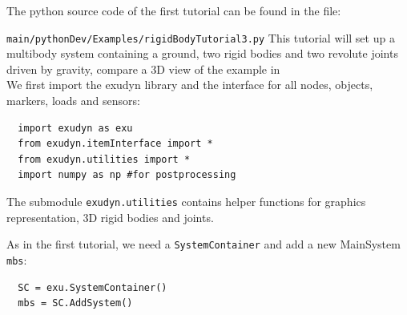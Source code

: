 \newpage
{}
The python source code of the first tutorial can be found in the file:
\bi
  \item[] \texttt{main/pythonDev/Examples/rigidBodyTutorial3.py}
\ei
This tutorial will set up a multibody system containing a ground, two rigid bodies and two revolute joints driven by gravity, compare a 3D view of the example in  
\horizontalRuler\\
\noindent We first import the exudyn library and the interface for all nodes, objects, markers, loads and sensors:
\pythonstyle\begin{lstlisting}
  import exudyn as exu
  from exudyn.itemInterface import *
  from exudyn.utilities import * 
  import numpy as np #for postprocessing
\end{lstlisting}
The submodule \texttt{exudyn.utilities} contains helper functions for graphics representation, 3D rigid bodies and joints.

\noindent As in the first tutorial, we need a \texttt{SystemContainer} and add a new MainSystem \texttt{mbs}:
\pythonstyle\begin{lstlisting}
  SC = exu.SystemContainer()
  mbs = SC.AddSystem()
\end{lstlisting}

